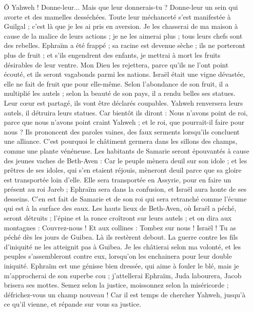 \begin{multicols}{2}
Ô Yahweh ! Donne-leur... Mais que leur donnerais-tu ? Donne-leur un sein qui avorte et des mamelles desséchées.
Toute leur méchanceté s’est manifestée à Guilgal ; c’est là que je les ai pris en aversion. Je les chasserai de ma maison à cause de la malice de leurs actions ; je ne les aimerai plus ; tous leurs chefs sont des rebelles.
Ephraïm a été frappé ; sa racine est devenue sèche ; ils ne porteront plus de fruit ; et s'ils engendrent des enfants, je mettrai à mort les fruits désirables de leur ventre.
Mon Dieu les rejettera, parce qu'ils ne l'ont point écouté, et ils seront vagabonds parmi les nations.
\VerseOne{}Israël était une vigne dévastée, elle ne fait de fruit que pour elle-même. Selon l'abondance de son fruit, il a multiplié les autels ; selon la beauté de son pays, il a rendu belles ses statues.
Leur cœur est partagé, ils vont être déclarés coupables. Yahweh renversera leurs autels, il détruira leurs statues.
Car bientôt ils diront : Nous n'avons point de roi, parce que nous n'avons point craint Yahweh ; et le roi, que pourrait-il faire pour nous ?
Ils prononcent des paroles vaines, des faux serments lorsqu’ils concluent une alliance. C'est pourquoi le châtiment germera dans les sillons des champs, comme une plante vénéneuse.
Les habitants de Samarie seront épouvantés à cause des jeunes vaches de Beth-Aven : Car le peuple mènera deuil sur son idole ; et les prêtres de ses idoles, qui s'en etaient réjouis, mèneront deuil parce que sa gloire est transportée loin d'elle.
Elle sera transportée en Assyrie, pour en faire un présent au roi Jareb ; Ephraïm sera dans la confusion, et Israël aura honte de ses desseins.
C’en est fait de Samarie et de son roi qui sera retranché comme l'écume qui est à la surface des eaux.
Les hauts lieux de Beth-Aven, où Israël a péché, seront détruits ; l'épine et la ronce croîtront sur leurs autels ; et on dira aux montagnes : Couvrez-nous ! Et aux collines : Tombez sur nous !
Israël ! Tu as péché dès les jours de Guibea. Là ils restèrent debout. La guerre contre les fils d'iniquité ne les atteignit pas à Guibea.
Je les châtierai selon ma volonté, et les peuples s’assembleront contre eux, lorsqu’on les enchainera pour leur double iniquité.
Ephraïm est une génisse bien dressée, qui aime à fouler le blé, mais je m’approcherai de son superbe cou ; j’attellerai Ephraïm, Juda labourera, Jacob brisera ses mottes.
Semez selon la justice, moissonnez selon la miséricorde ; défrichez-vous un champ nouveau ! Car il est temps de chercher Yahweh, jusqu'à ce qu'il vienne, et répande sur vous sa justice.

\end{multicols}
